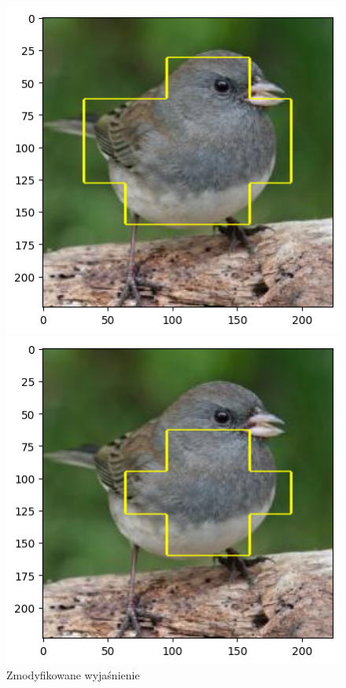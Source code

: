 \begin{figure}
	\begin{minipage}[b]{0.3\textwidth}
		\centering\includegraphics[width=.9\textwidth]{img/parameters/gradcam/threshold_02}
		\caption{Zmodyfikowane wyjaśnienie}  \label{rys:parameters_lime_numsamples_1000}
	\end{minipage}
	\begin{minipage}[b]{0.3\textwidth}
		\centering\includegraphics[width=.9\textwidth]{img/parameters/gradcam/threshold_05}

\end{minipage}
\end{figure}
